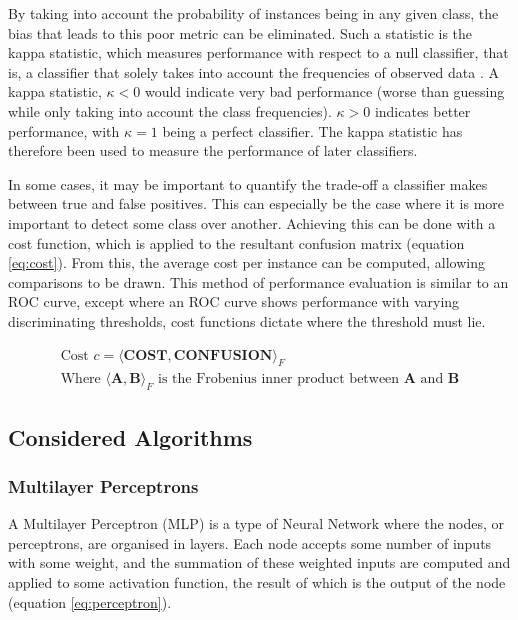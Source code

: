 By taking into account the probability of instances being in any given class, the bias that leads to this poor metric can be eliminated. Such a statistic is the kappa statistic, which measures performance with respect to a null classifier, that is, a classifier that solely takes into account the frequencies of observed data \cite{viera2005understanding}. A kappa statistic, $\kappa < 0$  would indicate very bad performance (worse than guessing while only taking into account the class frequencies). $\kappa > 0$ indicates better performance, with $\kappa = 1$ being a perfect classifier. The kappa statistic has therefore been used to measure the performance of later classifiers.

In some cases, it may be important to quantify the trade-off a classifier makes between true and false positives. This can especially be the case where it is more important to detect some class over another. Achieving this can be done with a cost function, which is applied to the resultant confusion matrix (equation \ref{eq:cost}). From this, the average cost per instance can be computed, allowing comparisons to be drawn. This method of performance evaluation is similar to an ROC curve, except where an ROC curve shows performance with varying discriminating thresholds, cost functions dictate where the threshold must lie.

\begin{equation}
	\label{eq:cost}
	\begin{gathered}
		\text{Cost } c = \langle \mathbf{COST}, \mathbf{CONFUSION} \rangle_F \\
		\text{Where $\langle \mathbf{A}, \mathbf{B}\rangle_F$ is the Frobenius inner product between $\mathbf{A}$ and $\mathbf{B}$}
	\end{gathered}
\end{equation}

\subsection{Considered Algorithms}

\subsubsection{Multilayer Perceptrons}
A Multilayer Perceptron (MLP) is a type of Neural Network where the nodes, or perceptrons, are organised in layers. Each node accepts some number of inputs with some weight, and the summation of these weighted inputs are computed and applied to some activation function, the result of which is the output of the node (equation \ref{eq:perceptron}).

